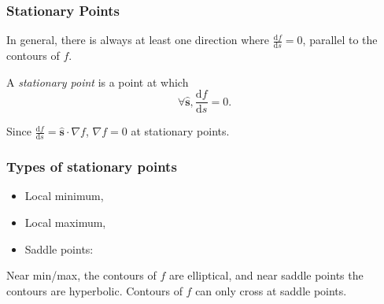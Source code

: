\documentclass[a4paper]{article}
\begin{document}
    \subsubsection{Stationary Points}
    In general, there is always at least one direction where $ \frac{\mathrm{d}f}{\mathrm{d}s}=0 $, parallel to the contours of $f$.
    \begin{definition}
        A \textit{stationary point} is a point at which 
        \[
            \forall \hat{\mathbf{s}}, \frac{\mathrm{d}f}{\mathrm{d}s}=0. 
        \]
    \end{definition}
    Since $ \frac{\mathrm{d}f}{\mathrm{d}s}=\hat{\mathbf{s}}\cdot \nabla f $, $ \nabla f=0 $ at stationary points.
    \subsubsection*{Types of stationary points}
    \begin{itemize}
        \item Local minimum,
        \item Local maximum,
        \item Saddle points:
        \begin{center}
          \end{center}
    \end{itemize}
    \begin{remark}
        Near min/max, the contours of $f$ are elliptical, and near saddle points the contours are hyperbolic. Contours of $f$ can only cross at saddle points.
    \end{remark}
\end{document}

